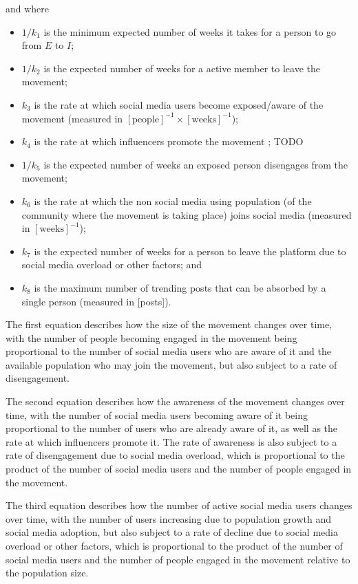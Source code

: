 \documentclass{article}
\begin{document}
    and where
    \begin{itemize}
        \item $1/k_1$ is the minimum expected number of weeks it takes for a person to go from $E$ to $I$;
        \item $1/k_2$ is the expected number of weeks for a active member to leave the movement;
        \item $k_3$ is the rate at which social media users become exposed/aware of the movement (measured in $[\text{people}]^{-1}\times[\text{weeks}]^{-1}$);
        \item $k_4$ is the rate at which influencers promote the movement ; TODO
        \item $1/k_5$ is the expected number of weeks an exposed person disengages from the movement;
        \item $k_6$ is the rate at which the non social media using population (of the community where the movement is taking place) joins social media (measured in $[\text{weeks}]^{-1}$);
        \item $k_7$ is the expected number of weeks for a person to leave the platform due to social media overload or other factors; and
        \item $k_8$ is the maximum number of trending posts that can be absorbed by a single person (measured in [posts]).
    \end{itemize}
    
    The first equation describes how the size of the movement changes over time, with the number of people becoming engaged in the movement being proportional to the number of social media users who are aware of it and the available population who may join the movement, but also subject to a rate of disengagement. 
    
	The second equation describes how the awareness of the movement changes over time, with the number of social media users becoming aware of it being proportional to the number of users who are already aware of it, as well as the rate at which influencers promote it. The rate of awareness is also subject to a rate of disengagement due to social media overload, which is proportional to the product of the number of social media users and the number of people engaged in the movement. 
 
	The third equation describes how the number of active social media users changes over time, with the number of users increasing due to population growth and social media adoption, but also subject to a rate of decline due to social media overload or other factors, which is proportional to the product of the number of social media users and the number of people engaged in the movement relative to the population size. 
 
\end{document}
